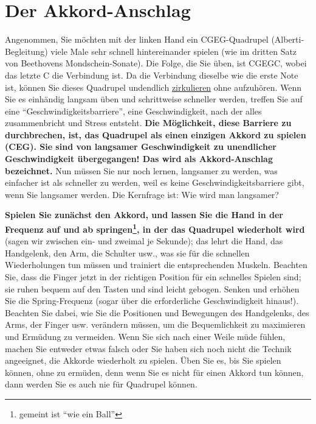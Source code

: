 \section{Der Akkord-Anschlag}\hypertarget{c1ii9}{}

Angenommen, Sie möchten mit der linken Hand ein CGEG-Quadrupel (Alberti-Begleitung) viele Male sehr schnell hintereinander spielen (wie im dritten Satz von Beethovens Mondschein-Sonate).
Die Folge, die Sie üben, ist CGEGC, wobei das letzte C die Verbindung ist.
Da die Verbindung dieselbe wie die erste Note ist, können Sie dieses Quadrupel undendlich \hyperlink{c1iii2}{zirkulieren} ohne aufzuhören.
Wenn Sie es einhändig langsam üben und schrittweise schneller werden, treffen Sie auf eine \enquote{Geschwindigkeitsbarriere}, eine Geschwindigkeit, nach der alles zusammenbricht und Stress entsteht.
\textbf{Die Möglichkeit, diese Barriere zu durchbrechen, ist, das Quadrupel als einen einzigen Akkord zu spielen (CEG).
Sie sind von langsamer Geschwindigkeit zu unendlicher Geschwindigkeit übergegangen!
Das wird als Akkord-Anschlag bezeichnet.}
Nun müssen Sie nur noch lernen, langsamer zu werden, was einfacher ist als schneller zu werden, weil es keine Geschwindigkeitsbarriere gibt, wenn Sie langsamer werden.
Die Kernfrage ist: Wie wird man langsamer?

\textbf{Spielen Sie zunächst den Akkord, und lassen Sie die Hand in der Frequenz auf und ab springen\footnote{gemeint ist \enquote{wie ein Ball}}, in der das Quadrupel wiederholt wird} (sagen wir zwischen ein- und zweimal je Sekunde); das lehrt die Hand, das Handgelenk, den Arm, die Schulter usw., was sie für die schnellen Wiederholungen tun müssen und trainiert die entsprechenden Muskeln.
Beachten Sie, dass die Finger jetzt in der richtigen Position für ein schnelles Spielen sind; sie ruhen bequem auf den Tasten und sind leicht gebogen.
Senken und erhöhen Sie die Spring-Frequenz (sogar über die erforderliche Geschwindigkeit hinaus!).
Beachten Sie dabei, wie Sie die Positionen und Bewegungen des Handgelenks, des Arms, der Finger usw. verändern müssen, um die Bequemlichkeit zu maximieren und Ermüdung zu vermeiden.
Wenn Sie sich nach einer Weile müde fühlen, machen Sie entweder etwas falsch oder Sie haben sich noch nicht die Technik angeeignet, die Akkorde wiederholt zu spielen.
Üben Sie es, bis Sie spielen können, ohne zu ermüden, denn wenn Sie es nicht für einen Akkord tun können, dann werden Sie es auch nie für Quadrupel können.

